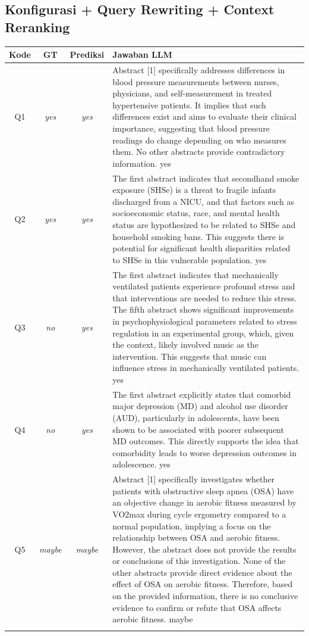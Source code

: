 \subsection*{Konfigurasi + Query Rewriting + Context Reranking}
\begin{longtable}{@{}c c c >{\raggedright\arraybackslash}p{8.8cm}@{}}
\toprule
\textbf{Kode} & \textbf{GT} & \textbf{Prediksi} & \textbf{Jawaban LLM} \\
\midrule\endhead
Q1 & \textit{yes} & \textit{yes} & Abstract [1] specifically addresses differences in blood pressure measurements between nurses, physicians, and self-measurement in treated hypertensive patients. It implies that such differences exist and aims to evaluate their clinical importance, suggesting that blood pressure readings do change depending on who measures them. No other abstracts provide contradictory information. yes \\
\addlinespace
Q2 & \textit{yes} & \textit{yes} & The first abstract indicates that secondhand smoke exposure (SHSe) is a threat to fragile infants discharged from a NICU, and that factors such as socioeconomic status, race, and mental health status are hypothesized to be related to SHSe and household smoking bans. This suggests there is potential for significant health disparities related to SHSe in this vulnerable population. yes \\
\addlinespace
Q3 & \textit{no} & \textit{yes} & The first abstract indicates that mechanically ventilated patients experience profound stress and that interventions are needed to reduce this stress. The fifth abstract shows significant improvements in psychophysiological parameters related to stress regulation in an experimental group, which, given the context, likely involved music as the intervention. This suggests that music can influence stress in mechanically ventilated patients. yes \\
\addlinespace
Q4 & \textit{no} & \textit{yes} & The first abstract explicitly states that comorbid major depression (MD) and alcohol use disorder (AUD), particularly in adolescents, have been shown to be associated with poorer subsequent MD outcomes. This directly supports the idea that comorbidity leads to worse depression outcomes in adolescence. yes \\
\addlinespace
Q5 & \textit{maybe} & \textit{maybe} & Abstract [1] specifically investigates whether patients with obstructive sleep apnea (OSA) have an objective change in aerobic fitness measured by VO2max during cycle ergometry compared to a normal population, implying a focus on the relationship between OSA and aerobic fitness. However, the abstract does not provide the results or conclusions of this investigation. None of the other abstracts provide direct evidence about the effect of OSA on aerobic fitness. Therefore, based on the provided information, there is no conclusive evidence to confirm or refute that OSA affects aerobic fitness. maybe \\
\addlinespace
\bottomrule
\end{longtable}

